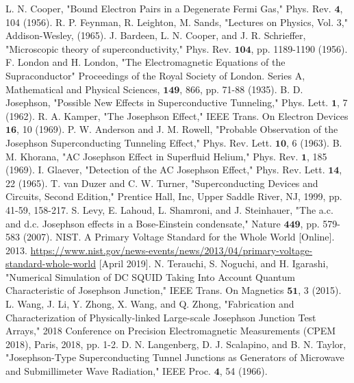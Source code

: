 \documentclass[letterpaper,english,reprint, aps]{revtex4}
\begin{document}
\begin{thebibliography}{}
 L. N. Cooper, "Bound Electron Pairs in a Degenerate Fermi Gas," Phys. Rev. $\boldsymbol{4}$, 104 (1956).
 R. P. Feynman, R. Leighton, M. Sands, "Lectures on Physics, Vol. 3," Addison-Wesley, (1965). 
 J. Bardeen, L. N. Cooper, and J. R. Schrieffer, "Microscopic theory of superconductivity," Phys. Rev. $\boldsymbol{104}$, pp. 1189-1190 (1956). 
 F. London and  H. London, "The Electromagnetic Equations of the Supraconductor" Proceedings of the Royal Society of London. Series A, Mathematical and Physical Sciences, $\boldsymbol{149}$, 866, pp. 71-88 (1935). 
 B. D. Josephson, "Possible New Effects in Superconductive Tunneling," Phys. Lett. $\boldsymbol{1}$, 7 (1962).
 R. A. Kamper, "The Josephson Effect," IEEE Trans. On Electron Devices $\boldsymbol{16}$, 10 (1969).
 P. W. Anderson and J. M. Rowell, "Probable Observation of the Josephson Superconducting Tunneling Effect," Phys. Rev. Lett. $\boldsymbol{10}$, 6 (1963).
 B. M. Khorana, "AC Josephson Effect in Superfluid Helium," Phys. Rev. $\boldsymbol{1}$, 185 (1969).
 I. Glaever, "Detection of the AC Josephson Effect," Phys. Rev. Lett. $\boldsymbol{14}$, 22 (1965).
 T. van Duzer and C. W. Turner, "Superconducting Devices and Circuits, Second Edition," Prentice Hall, Inc, Upper Saddle River, NJ, 1999, pp. 41-59, 158-217. 
	S. Levy, E. Lahoud, L. Shamroni, and J. Steinhauer, "The a.c. and d.c. Josephson effects in a Bose-Einstein condensate," Nature $\boldsymbol{449}$, pp. 579-583 (2007).
 NIST. A Primary Voltage Standard for the Whole World [Online]. 2013. \href{https://www.nist.gov/news-events/news/2013/04/primary-voltage-standard-whole-world}{https://www.nist.gov/news-events/news/2013/04/primary-voltage-standard-whole-world} [April 2019].
	N. Terauchi, S. Noguchi, and H. Igarashi, "Numerical Simulation of DC SQUID Taking Into Account Quantum Characteristic of Josephson Junction," IEEE Trans. On Magnetics $\boldsymbol{51}$, 3 (2015).
	L. Wang, J. Li, Y. Zhong, X. Wang, and Q. Zhong, "Fabrication and Characterization of Physically-linked Large-scale Josephson Junction Test Arrays," 2018 Conference on Precision Electromagnetic Measurements (CPEM 2018), Paris, 2018, pp. 1-2.
	D. N. Langenberg, D. J. Scalapino, and B. N. Taylor, "Josephson-Type Superconducting Tunnel Junctions as Generators of Microwave and Submillimeter Wave Radiation," IEEE Proc. $\boldsymbol{4}$, 54 (1966).

\end{thebibliography}
\end{document}
